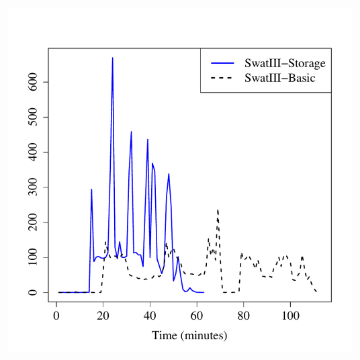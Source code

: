 \documentclass[conference]{IEEEtran}
\begin{document}
\begin{figure}[htb]
        \begin{subfigure}[b]{0.23\textwidth}
                \includegraphics[width=\textwidth]{Figure/SystemData/Plots/BGHddSsdWrIops.pdf}

\end{subfigure}
\end{figure}
\end{document}
